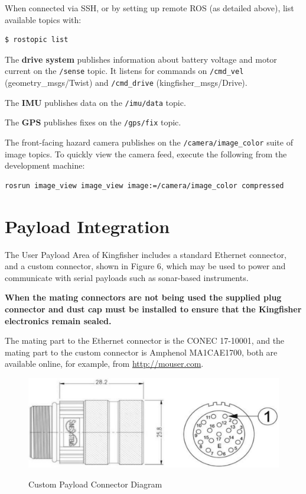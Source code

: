 \documentclass[]{clearpath-latex/clearpath-manual}
\begin{document}
When connected via SSH, or by setting up remote ROS (as detailed above), list available topics with:

\begin{lstlisting}
$ rostopic list
\end{lstlisting}

The \textbf{drive system} publishes information about battery voltage and motor current on the \lstinline{/sense} topic. It listens for commands on \lstinline{/cmd_vel} (geometry\_msgs/Twist) and \lstinline{/cmd_drive} (kingfisher\_msgs/Drive).

The \textbf{IMU} publishes data on the \lstinline{/imu/data} topic.

The \textbf{GPS} publishes fixes on the \lstinline{/gps/fix} topic.

The front-facing hazard camera publishes on the \lstinline{/camera/image_color} suite of image topics. To quickly view the camera feed, execute the following from the development machine: 

\begin{lstlisting}
rosrun image_view image_view image:=/camera/image_color compressed
\end{lstlisting}

\newpage

\section{Payload Integration}
The User Payload Area of Kingfisher includes a standard Ethernet connector, and a custom connector, shown in Figure 6, which may be used to power and communicate with serial payloads such as sonar-based instruments.

\textbf{When the mating connectors are not being used the supplied plug connector and dust cap must be installed to ensure that the Kingfisher electronics remain sealed.}

The mating part to the Ethernet connector is the CONEC 17-10001, and the mating part to the custom connector is Amphenol MA1CAE1700, both are available online, for example, from \url{http://mouser.com}.

\begin{figure}[h]
  \centering
  \includegraphics[width=0.75\linewidth]{kf_custompayload.PNG}
  \label{kf_custompayload}
  \caption{Custom Payload Connector Diagram}
\end{figure}
\end{document}
